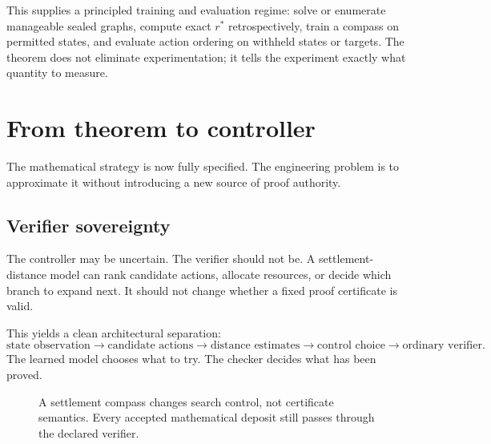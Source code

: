 \documentclass[11pt,letterpaper]{article}
\theoremstyle{remark}
\newcommand{\A}{\mathcal A}
\newcommand{\rstar}{r^{\!*}}
\newcommand{\rhat}{\widehat r}
\newcommand{\argmin}{\operatorname*{arg\,min}}
\begin{document}
This supplies a principled training and evaluation regime: solve or enumerate manageable sealed graphs, compute exact $\rstar$ retrospectively, train a compass on permitted states, and evaluate action ordering on withheld states or targets. The theorem does not eliminate experimentation; it tells the experiment exactly what quantity to measure.

\section{From theorem to controller}\label{sec:controller}

The mathematical strategy is now fully specified. The engineering problem is to approximate it without introducing a new source of proof authority.

\subsection{Verifier sovereignty}

The controller may be uncertain. The verifier should not be. A settlement-distance model can rank candidate actions, allocate resources, or decide which branch to expand next. It should not change whether a fixed proof certificate is valid.

This yields a clean architectural separation:
\[
\text{state observation}\longrightarrow\text{candidate actions}\longrightarrow\text{distance estimates}
\longrightarrow\text{control choice}\longrightarrow\text{ordinary verifier}.
\]
The learned model chooses what to try. The checker decides what has been proved.

\begin{figure}[ht]
\centering
{}
\caption{A settlement compass changes search control, not certificate semantics. Every accepted mathematical deposit still passes through the declared verifier.}
\label{fig:controller}
\end{figure}
\end{document}

